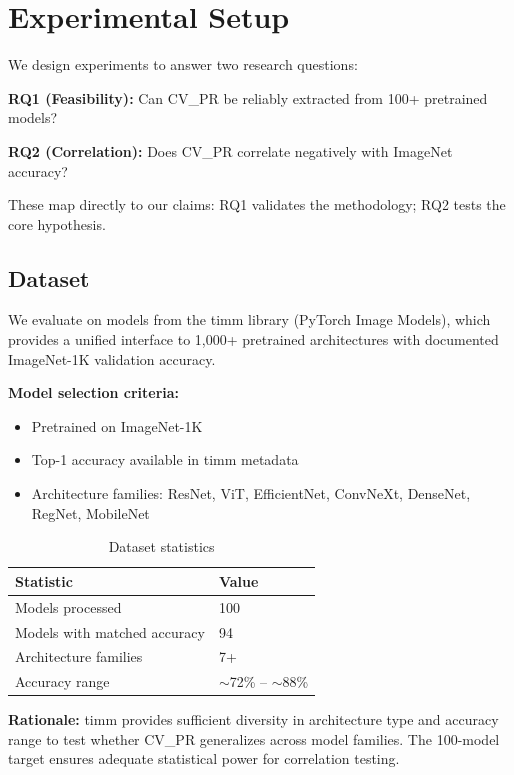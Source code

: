 \section{Experimental Setup}
\label{sec:experiments}

We design experiments to answer two research questions:

\textbf{RQ1 (Feasibility):} Can CV\_PR be reliably extracted from 100+ pretrained models?

\textbf{RQ2 (Correlation):} Does CV\_PR correlate negatively with ImageNet accuracy?

These map directly to our claims: RQ1 validates the methodology; RQ2 tests the core hypothesis.

\subsection{Dataset}

We evaluate on models from the timm library (PyTorch Image Models), which provides a unified interface to 1,000+ pretrained architectures with documented ImageNet-1K validation accuracy.

\textbf{Model selection criteria:}
\begin{itemize}
    \item Pretrained on ImageNet-1K
    \item Top-1 accuracy available in timm metadata
    \item Architecture families: ResNet, ViT, EfficientNet, ConvNeXt, DenseNet, RegNet, MobileNet
\end{itemize}

\begin{table}[h]
\centering
\caption{Dataset statistics}
\label{tab:dataset}
\begin{tabular}{@{}ll@{}}
\toprule
Statistic & Value \\
\midrule
Models processed & 100 \\
Models with matched accuracy & 94 \\
Architecture families & 7+ \\
Accuracy range & $\sim$72\% -- $\sim$88\% \\
\bottomrule
\end{tabular}
\end{table}

\textbf{Rationale:} timm provides sufficient diversity in architecture type and accuracy range to test whether CV\_PR generalizes across model families. The 100-model target ensures adequate statistical power for correlation testing.


